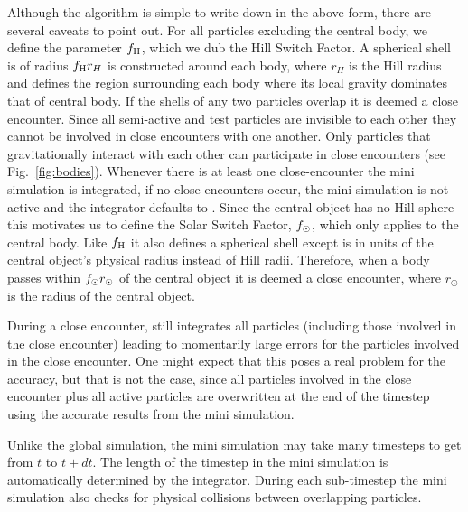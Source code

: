 Although the algorithm is simple to write down in the above form, there are several caveats to point out.
For all particles excluding the central body, we define the parameter $f_{\rm H}$, which we dub the Hill Switch Factor. 
A spherical shell is of radius $f_{\rm H} r_H$ is constructed around each body, where $r_H$ is the Hill radius and defines the region surrounding each body where its local gravity dominates that of central body.
If the shells of any two particles overlap it is deemed a close encounter.
Since all semi-active and test particles are invisible to each other they cannot be involved in close encounters with one another.
Only particles that gravitationally interact with each other can participate in close encounters (see Fig.~\ref{fig:bodies}).
Whenever there is at least one close-encounter the mini simulation is integrated, if no close-encounters occur, the mini simulation is not active and the integrator defaults to \whfast. 
Since the central object has no Hill sphere this motivates us to define the Solar Switch Factor, $f_{\rm \odot}$, which only applies to the central body. 
Like $f_{\rm H}$ it also defines a spherical shell except is in units of the central object's physical radius instead of Hill radii.
Therefore, when a body passes within $f_{\rm \odot} r_{\odot}$ of the central object it is deemed a close encounter, where $r_{\odot}$ is the radius of the central object.

During a close encounter, \whfast still integrates all particles (including those involved in the close encounter) leading to momentarily large errors for the particles involved in the close encounter.
One might expect that this poses a real problem for the accuracy, but that is not the case, since all particles involved in the close encounter plus all active particles are overwritten at the end of the timestep using the accurate results from the mini simulation.

Unlike the global simulation, the mini simulation may take many timesteps to get from $t$ to $t + dt$.
The length of the timestep in the mini simulation is automatically determined by the \ias integrator.
During each sub-timestep the mini simulation also checks for physical collisions between overlapping particles. 

